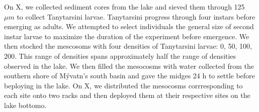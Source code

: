 On X, we collected sediment cores from the lake and sieved them through 125 $\mu m$
to collect Tanytarsini larvae.
Tanytarsini progress through four instars before emerging as adults.
We attempted to select individuals the general size of second instar larvae
to maximize the duration of the experiment before emergence.
We then stocked the mescosoms with four densities of Tanytarsini larvae:
0, 50, 100, 200. 
This range of densities spans approximately half the range of densities observed in the lake.
We then filled the mesocosms with water collected from the southern shore of M\'{y}vatn's
south basin and gave the midges 24 h to settle before beploying in the lake.
On X, we distributed the mesocosms corrresponding to each site onto two racks and then
deployed them at their respective sites on the lake bottomo.







